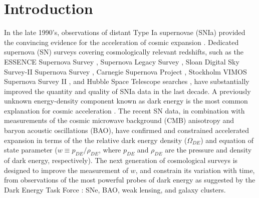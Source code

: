 \documentclass[preprint2]{aastex}    %
\begin{document}
\section{Introduction}\label{sec:intro}
In the late 1990's, observations of distant Type Ia supernovae (SNIa) provided
the convincing evidence for the acceleration of cosmic expansion \citep{rie98,per99}. 
Dedicated supernova (SN) surveys
covering cosmologically relevant redshifts, such as the ESSENCE Supernova Survey \citep{mik07,fol09}, 
Supernova Legacy Survey \citep[SNLS,][]{ast06,con11}, Sloan Digital
Sky Survey-II Supernova Survey \citep[SDSS,][]{Fri08a,sak11}, 
Carnegie Supernova Project \citep[][]{ham06,csp11}, Stockholm VIMOS Supernova Survey II \citep{mel11},
and Hubble Space Telescope searches 
\citep[e.g.,][]{str04,daw09,ama10}, have substantially
improved the quantity and quality of SNIa data in the last decade.
A previously unknown energy-density component known as dark energy
is the most common explanation for cosmic acceleration
\citep[for a review, see][]{fri08b,wei12}. 
The recent SN data, in
combination with measurements of the cosmic microwave
background (CMB) anisotropy and baryon acoustic oscillations
(BAO), have confirmed and constrained accelerated expansion in terms of the 
the relative dark energy density ($\Omega_{DE}$) and equation of state 
parameter ($w\equiv p_{DE}/\rho_{DE}$, where $p_{DE}$ and $\rho_{DE}$ are the pressure and density of dark
energy, respectively). The next generation of cosmological surveys is
designed to improve the measurement of $w$, and constrain its variation with time, 
from observations of the most powerful probes of dark energy as suggested by the Dark Energy
Task Force \citep{alb06}: SNe, BAO, weak lensing, and galaxy clusters.
\end{document}
